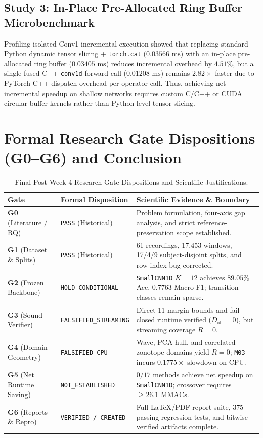 \documentclass[11pt,a4paper]{article}
\newcommand{\code}[1]{{\small\ttfamily\nolinkurl{#1}}}
\theoremstyle{remark}
\begin{document}
\subsection{Study 3: In-Place Pre-Allocated Ring Buffer Microbenchmark}
Profiling isolated Conv1 incremental execution showed that replacing standard Python dynamic tensor slicing + \code{torch.cat} ($0.03566\text{ ms}$) with an in-place pre-allocated ring buffer ($0.03405\text{ ms}$) reduces incremental overhead by $4.51\%$, but a single fused C++ \code{conv1d} forward call ($0.01208\text{ ms}$) remains $2.82\times$ faster due to PyTorch C++ dispatch overhead per operator call. Thus, achieving net incremental speedup on shallow networks requires custom C/C++ or CUDA circular-buffer kernels rather than Python-level tensor slicing.

\section{Formal Research Gate Dispositions (G0--G6) and Conclusion}

\begin{table}[!htbp]
\centering\small
\caption{Final Post-Week 4 Research Gate Dispositions and Scientific Justifications.}
\label{tab:gates}
\begin{tabularx}{\linewidth}{@{}llY@{}}
\toprule
\textbf{Gate} & \textbf{Formal Disposition} & \textbf{Scientific Evidence \& Boundary} \\
\midrule
\textbf{G0} (Literature / RQ) & \code{PASS} (Historical) & Problem formulation, four-axis gap analysis, and strict reference-preservation scope established. \\
\textbf{G1} (Dataset \& Splits) & \code{PASS} (Historical) & 61 recordings, 17,453 windows, 17/4/9 subject-disjoint splits, and row-index bug corrected. \\
\textbf{G2} (Frozen Backbone) & \code{HOLD\_CONDITIONAL} & \code{SmallCNN1D} $K=12$ achieves $89.05\%$ Acc, $0.7763$ Macro-F1; transition classes remain sparse. \\
\textbf{G3} (Sound Verifier) & \code{FALSIFIED\_STREAMING} & Direct 11-margin bounds and fail-closed runtime verified ($D_{\text{all}}=0$), but streaming coverage $R=0$. \\
\textbf{G4} (Domain Geometry) & \code{FALSIFIED\_CPU} & Wave, PCA hull, and correlated zonotope domains yield $R=0$; \code{M03} incurs $0.1775\times$ slowdown on CPU. \\
\textbf{G5} (Net Runtime Saving) & \code{NOT\_ESTABLISHED} & $0/17$ methods achieve net speedup on \code{SmallCNN1D}; crossover requires $\ge 26.1\text{ MMACs}$. \\
\textbf{G6} (Reports \& Repro) & \code{VERIFIED / CREATED} & Full LaTeX/PDF report suite, 375 passing regression tests, and bitwise-verified artifacts complete. \\
\bottomrule
\end{tabularx}
\end{table}
\end{document}
